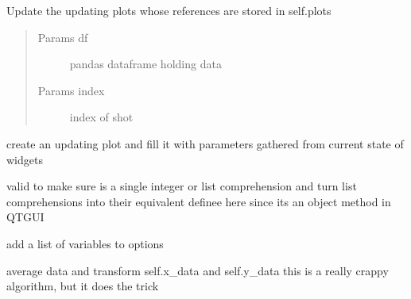 \documentclass[letterpaper,10pt,english]{sphinxmanual}
\begin{document}
\begin{fulllineitems}

\begin{fulllineitems}
\label{VisualPlotter:Visualplotterwidget.VisualPlotter.update_plots}
Update the updating plots whose references are stored in self.plots
\begin{quote}\begin{description}
\item[{Params df}] \leavevmode
pandas dataframe holding data

\item[{Params index}] \leavevmode
index of shot

\end{description}\end{quote}

\end{fulllineitems}


\begin{fulllineitems}
\label{VisualPlotter:Visualplotterwidget.VisualPlotter.updating_plot}
create an updating plot and fill it with parameters
gathered from current state of widgets

\end{fulllineitems}


\begin{fulllineitems}
\label{VisualPlotter:Visualplotterwidget.VisualPlotter.validate}
valid to make sure is a single integer or list comprehension
and turn list comprehensions into their equivalent
definee here since its an object method in QTGUI

\end{fulllineitems}


\begin{fulllineitems}
\label{VisualPlotter:Visualplotterwidget.VisualPlotter.var_push}
add a list of variables to options

\end{fulllineitems}


\begin{fulllineitems}
\label{VisualPlotter:Visualplotterwidget.VisualPlotter.verbose_avg}
average data and transform self.x\_data and self.y\_data
this is a really crappy algorithm, but it does the trick

\end{fulllineitems}


\end{fulllineitems}
\end{document}
